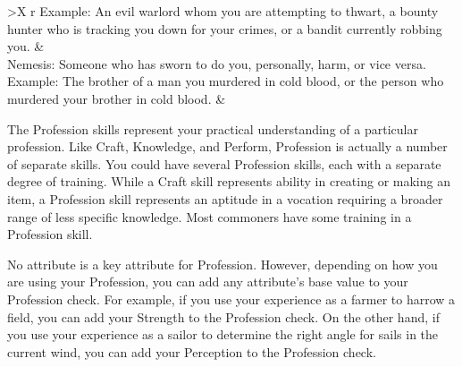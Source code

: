 \begin{dtable}
\begin{dtabularx}{\columnwidth}{>{\lcol}X r}
        Example: An evil warlord whom you are attempting to thwart, a bounty hunter who is tracking you down for your crimes, or a bandit currently robbing you.                                                          &   \\
        Nemesis: Someone who has sworn to do you, personally, harm, or vice versa. Example: The brother of a man you murdered in cold blood, or the person who murdered your brother in cold blood.                                                             &   \\
      \end{dtabularx}
    \end{dtable}

\newpage
{}
  The Profession skills represent your practical understanding of a particular profession.
  Like Craft, Knowledge, and Perform, Profession is actually a number of separate skills.
  You could have several Profession skills, each with a separate degree of training.
  While a Craft skill represents ability in creating or making an item, a Profession skill represents an aptitude in a vocation requiring a broader range of less specific knowledge.
  Most commoners have some training in a Profession skill.

  No attribute is a key attribute for Profession.
  However, depending on how you are using your Profession, you can add any attribute's base value to your Profession check.
  For example, if you use your experience as a farmer to harrow a field, you can add your Strength to the Profession check.
  On the other hand, if you use your experience as a sailor to determine the right angle for sails in the current wind, you can add your Perception to the Profession check.

